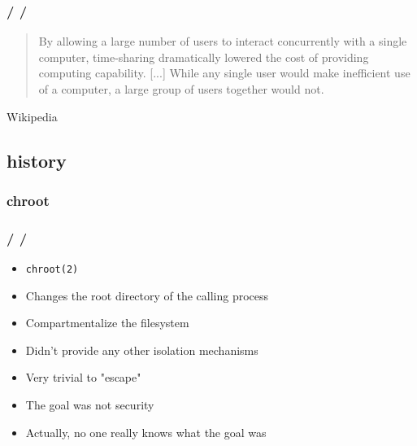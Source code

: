 \documentclass{beamer}
\newcommand{\autotitle}
{\frametitle{
    \secname
    \ifx\insertsubsection\empty
    \else
        /\subsecname
        \ifx\insertsubsubsection\empty\else/\subsubsecname\fi
    \fi}}
\begin{document}
\begin{frame}
    \autotitle
    \begin{quote}
        By allowing a large number of users to interact concurrently with a
        single computer, time-sharing dramatically lowered the cost of
        providing computing capability.  [...] While any single user would make
        inefficient use of a computer, a large group of users together would
        not.
    \end{quote}
    Wikipedia \cite{wikipedia_time_sharing}
\end{frame}

\subsection{history}

\subsubsection{chroot}

\begin{frame}
    \autotitle
    \begin{itemize}
        \item \texttt{chroot(2)}
        \item Changes the root directory of the calling process
        \item Compartmentalize the filesystem
        \item Didn't provide any other isolation mechanisms
        \item Very trivial to "escape"
        \item The goal was not security
        \item Actually, no one really knows what the goal was
    \end{itemize}
\end{frame}
\end{document}
